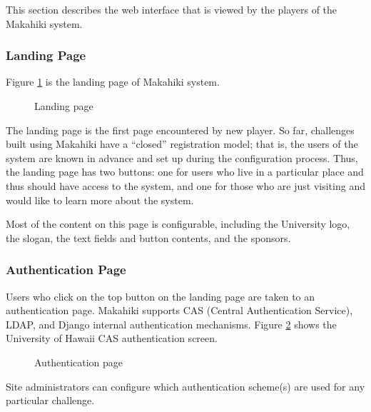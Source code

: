This section describes the web interface that is viewed by the players of the Makahiki system. 

\subsubsection{Landing Page}
Figure \ref{fig:makahiki-landing} is the landing page of Makahiki system.

\begin{figure}[!ht]
\begin{center}
\end{center}
\caption{Landing page}
\label{fig:makahiki-landing}
\end{figure}

The landing page is the first page encountered by new player. So far, challenges built using Makahiki have a ``closed'' registration model; that is, the users of the system are known in advance and set up during the configuration process. Thus, the landing page has two buttons: one for users who live in a particular place and thus should have access to the system, and one for those who are just visiting and would like to learn more about the system.

Most of the content on this page is configurable, including the University logo, the slogan, the text fields and button contents, and the sponsors.

\clearpage

\subsubsection{Authentication Page}

Users who click on the top button on the landing page are taken to an authentication page. Makahiki supports CAS (Central Authentication Service), LDAP, and Django internal authentication mechanisms. Figure \ref{fig:makahiki-auth} shows the University of Hawaii CAS authentication screen.

\begin{figure}[!ht]
\begin{center}
\end{center}
\caption{Authentication page}
\label{fig:makahiki-auth}
\end{figure}

Site administrators can configure which authentication scheme(s) are used for any particular challenge.

